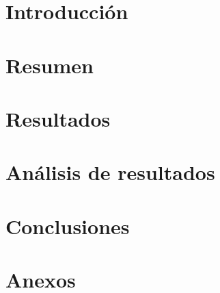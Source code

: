 \documentclass{article}
\begin{document}

\tableofcontents
\newpage

\section{Introducción}



\section{Resumen}





\section{Resultados}

\section{Análisis de resultados}

\section{Conclusiones}

\section{Anexos}

\end{document}
